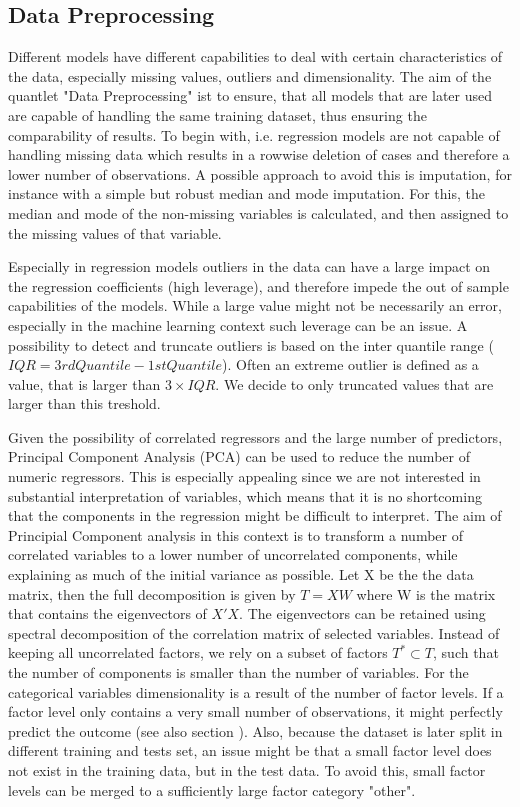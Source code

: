 \subsection{Data Preprocessing}\label{sec:data_theory}

Different models have different capabilities to deal with certain characteristics of the data, especially missing values, outliers and dimensionality.  The aim of the quantlet "Data Preprocessing" ist to ensure, that all models that are later used are capable of handling the same training dataset, thus ensuring the comparability of results. 
To begin with, i.e. regression models are not capable of handling missing data which results in a rowwise deletion of cases and therefore a lower number of observations. A possible approach to avoid this is  imputation, for instance with a simple but robust median and mode imputation. For this, the median and mode of the non-missing variables is calculated, and then assigned to the missing values of that variable. 

Especially in regression models outliers in the data can have a large impact on the regression coefficients (high leverage), and therefore impede the out of sample capabilities of the  models. While a large value might not be necessarily an error, especially in the machine learning context such leverage can be an issue. A possibility to detect and truncate outliers is based on the inter quantile range ($IQR = 3rd Quantile -1st Quantile$).
Often an extreme outlier is defined as a value, that is larger than $3 \times IQR$. We decide to only truncated values that are larger than this treshold. 

Given the possibility of correlated regressors and the large number of predictors, Principal Component Analysis (PCA) can be used to reduce the number of numeric regressors. This is especially appealing since we are not interested in substantial interpretation of variables, which means that it is no shortcoming that the components in the regression might be difficult to interpret. 
The aim of Principial Component analysis in this context is to transform a number of correlated variables to a lower number of uncorrelated components, while explaining as much of the initial variance as possible. 
Let X be the the data matrix, then the full decomposition is given by 
  $  T = XW $
where W is the matrix that contains the eigenvectors of $X'X$.  
The eigenvectors can be retained using spectral decomposition of the correlation matrix of selected variables.
Instead of keeping all uncorrelated factors, we rely on a subset of factors $T^* \subset T$, such that the number of components is smaller than the number of variables. 
For the categorical variables dimensionality is a result of the number of factor levels. If a factor level only contains a very small number of observations, it might perfectly predict the outcome (see also section ). Also, because the dataset is later split in different training and tests set, an issue might be that a small factor level does not exist in the training data, but in the test data. To avoid this, small factor levels can be merged to a sufficiently large factor category "other". 